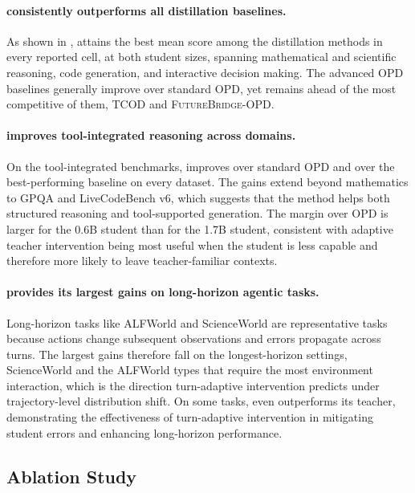 \vspace{-0.5em}
\paragraph{\name consistently outperforms all distillation baselines.}
As shown in , \name attains the best mean score among the distillation methods in every reported cell, at both student sizes, spanning mathematical and scientific reasoning, code generation, and interactive decision making.
The advanced OPD baselines generally improve over standard \textsc{OPD}, yet \name remains ahead of the most competitive of them, \textsc{TCOD} and \textsc{FutureBridge-OPD}. 

\vspace{-0.5em}
\paragraph{\name improves tool-integrated reasoning across domains.}
On the tool-integrated benchmarks, \name improves over standard \textsc{OPD} and over the best-performing baseline on every dataset.
The gains extend beyond mathematics to GPQA and LiveCodeBench v6, which suggests that the method helps both structured reasoning and tool-supported generation.
The margin over \textsc{OPD} is larger for the 0.6B student than for the 1.7B student, consistent with adaptive teacher intervention being most useful when the student is less capable and therefore more likely to leave teacher-familiar contexts.

\vspace{-0.5em}
\paragraph{\name provides its largest gains on long-horizon agentic tasks.}
Long-horizon tasks like ALFWorld and ScienceWorld are representative tasks because actions change subsequent observations and errors propagate across turns. 
The largest gains therefore fall on the longest-horizon settings, ScienceWorld and the ALFWorld types that require the most environment interaction, which is the direction turn-adaptive intervention predicts under trajectory-level distribution shift. 
On some tasks, \name even outperforms its teacher, demonstrating the effectiveness of turn-adaptive intervention in mitigating student errors and enhancing long-horizon performance.


\subsection{Ablation Study}
\label{sec:ablation_study}

